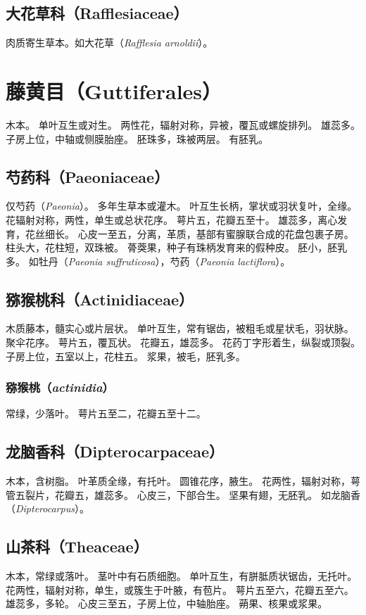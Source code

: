 \documentclass[11pt]{article}
\begin{document}
\begin{sloppypar}
\subsection{大花草科（Rafflesiaceae）}
肉质寄生草本。如大花草（\textit{Rafflesia arnoldii}）。

\section{藤黄目（Guttiferales）}
木本。
单叶互生或对生。
两性花，辐射对称，异被，覆瓦或螺旋排列。
雄蕊多。
子房上位，中轴或侧膜胎座。
胚珠多，珠被两层。
有胚乳。

\subsection{芍药科（Paeoniaceae）}
仅芍药（\textit{Paeonia}）。
多年生草本或灌木。
叶互生长柄，掌状或羽状复叶，全缘。
花辐射对称，两性，单生或总状花序。
萼片五，花瓣五至十。
雄蕊多，离心发育，花丝细长。
心皮一至五，分离，革质，基部有蜜腺联合成的花盘包裹子房。
柱头大，花柱短，双珠被。
蓇葖果，种子有珠柄发育来的假种皮。
胚小，胚乳多。
如牡丹（\textit{Paeonia suffruticosa}），芍药（\textit{Paeonia lactiflora}）。

\subsection{猕猴桃科（Actinidiaceae）}
木质藤本，髓实心或片层状。
单叶互生，常有锯齿，被粗毛或星状毛，羽状脉。
聚伞花序。
萼片五，覆瓦状。
花瓣五，雄蕊多。
花药丁字形着生，纵裂或顶裂。
子房上位，五室以上，花柱五。
浆果，被毛，胚乳多。

\subsubsection{猕猴桃（\textit{actinidia}）}
常绿，少落叶。
萼片五至二，花瓣五至十二。

\subsection{龙脑香科（Dipterocarpaceae）}
木本，含树脂。
叶革质全缘，有托叶。
圆锥花序，腋生。
花两性，辐射对称，萼管五裂片，花瓣五，雄蕊多。
心皮三，下部合生。
坚果有翅，无胚乳。
如龙脑香（\textit{Dipterocarpus}）。

\subsection{山茶科（Theaceae）}
木本，常绿或落叶。
茎叶中有石质细胞。
单叶互生，有胼胝质状锯齿，无托叶。
花两性，辐射对称，单生，或簇生于叶腋，有苞片。
萼片五至六，花瓣五至六。
雄蕊多，多轮。
心皮三至五，子房上位，中轴胎座。
蒴果、核果或浆果。


\end{sloppypar}
\end{document}
